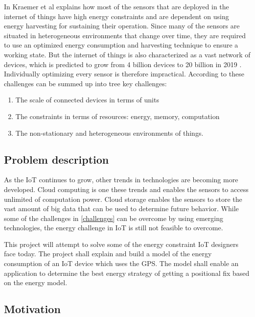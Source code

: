 In \cite{kraemer} Kraemer et al explains how most of the sensors that are deployed in the internet of things have high energy constraints and are dependent on using energy harvesting for sustaining their operation. Since many of the sensors are situated in heterogeneous environments that change over time, they are required to use an optimized energy consumption and harvesting technique to ensure a working state. But the internet of things is also characterized as a vast network of devices, which is predicted to grow from 4 billion devices to 20 billion in 2019 \cite{IEA}. Individually optimizing every sensor is therefore impractical. According to \cite{frank} these challenges can be summed up into tree key challenges: 
\begin{enumerate}
    \item The scale of connected devices in terms of units
    \item The constraints in terms of resources: energy, memory, computation
    \item The non-stationary and heterogeneous environments of things.
    \label{challenges}
    
\end{enumerate}

\subsection{Problem description}

As the  IoT continues to grow, other trends in technologies are becoming more developed. Cloud computing is one these trends  and enables the sensors to access unlimited of computation power\cite{Cloud}. Cloud storage enables the sensors to store the vast amount of big data that can be used to determine future behavior. While some of the challenges in \ref{challenges} can be overcome by using emerging technologies, the energy challenge in IoT is still not feasible to overcome. 

This project will attempt to solve some of the energy constraint IoT designers face today. The project shall explain and build a model of the energy consumption of an IoT device which uses the GPS. The model shall enable an application to determine the best energy strategy of getting a positional fix based on the energy model. 




\subsection{Motivation}


